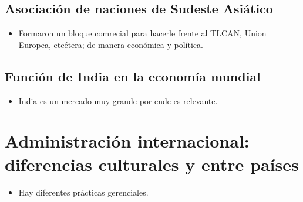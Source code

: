 \documentclass{article}
\begin{document}
\subsection{Asociación de naciones de Sudeste Asiático}
\begin{itemize}
    \item Formaron un bloque comrecial para hacerle frente al TLCAN, Union Europea, etcétera; de manera económica y política.
\end{itemize}

\subsection{Función de India en la economía mundial}
\begin{itemize}
    \item India es un mercado muy grande por ende es relevante.
\end{itemize}

\section{Administración internacional: diferencias culturales y entre países}
\begin{itemize}
    \item Hay diferentes prácticas gerenciales.
\end{itemize}

\end{document}
